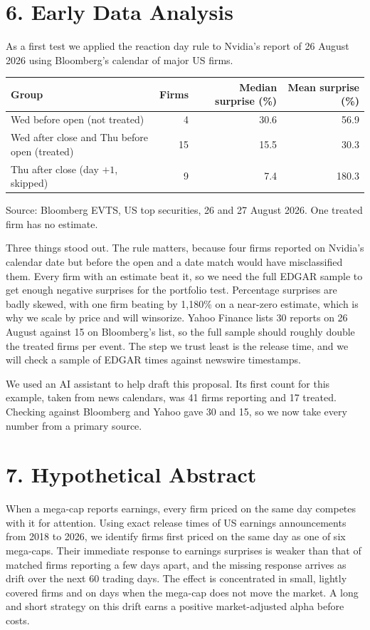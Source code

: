 \documentclass[11pt]{article}
\begin{document}
\section*{6. Early Data Analysis}

As a first test we applied the reaction day rule to Nvidia's report of 26 August 2026 using Bloomberg's calendar of major US firms.

\begin{table}[h]
\centering
\small
\begin{tabular}{@{}l r r r@{}}
\toprule
Group & Firms & Median surprise (\%) & Mean surprise (\%) \\
\midrule
Wed before open (not treated) & 4 & 30.6 & 56.9 \\
Wed after close and Thu before open (treated) & 15 & 15.5 & 30.3 \\
Thu after close (day $+1$, skipped) & 9 & 7.4 & 180.3 \\
\bottomrule
\end{tabular}

\vspace{2pt}
{\footnotesize Source: Bloomberg EVTS, US top securities, 26 and 27 August 2026. One treated firm has no estimate.}
\end{table}

Three things stood out. The rule matters, because four firms reported on Nvidia's calendar date but before the open and a date match would have misclassified them. Every firm with an estimate beat it, so we need the full EDGAR sample to get enough negative surprises for the portfolio test. Percentage surprises are badly skewed, with one firm beating by 1,180\% on a near-zero estimate, which is why we scale by price and will winsorize. Yahoo Finance lists 30 reports on 26 August against 15 on Bloomberg's list, so the full sample should roughly double the treated firms per event. The step we trust least is the release time, and we will check a sample of EDGAR times against newswire timestamps.

We used an AI assistant to help draft this proposal. Its first count for this example, taken from news calendars, was 41 firms reporting and 17 treated. Checking against Bloomberg and Yahoo gave 30 and 15, so we now take every number from a primary source.

\section*{7. Hypothetical Abstract}

When a mega-cap reports earnings, every firm priced on the same day competes with it for attention. Using exact release times of US earnings announcements from 2018 to 2026, we identify firms first priced on the same day as one of six mega-caps. Their immediate response to earnings surprises is weaker than that of matched firms reporting a few days apart, and the missing response arrives as drift over the next 60 trading days. The effect is concentrated in small, lightly covered firms and on days when the mega-cap does not move the market. A long and short strategy on this drift earns a positive market-adjusted alpha before costs.



\end{document}
